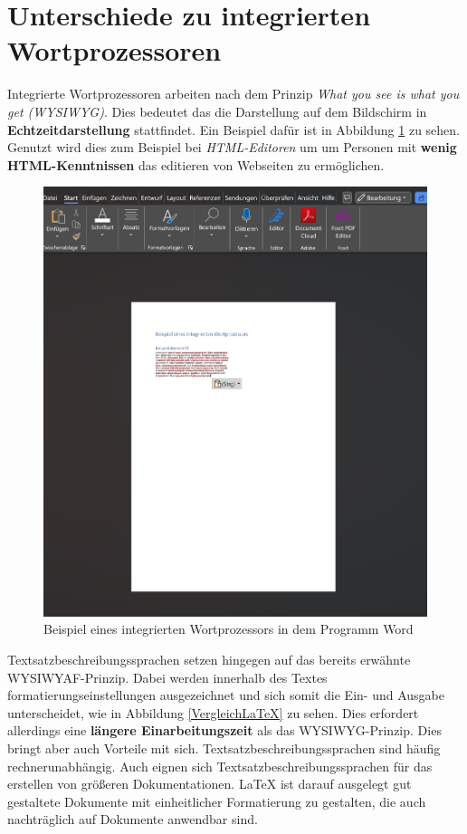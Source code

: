 \section{Unterschiede zu integrierten Wortprozessoren}
Integrierte Wortprozessoren arbeiten nach dem Prinzip \textit{What you see is what you get (WYSIWYG)}. Dies bedeutet das die Darstellung auf dem Bildschirm in \textbf{Echtzeitdarstellung} stattfindet. Ein Beispiel dafür ist in Abbildung \ref{Wortprozessor} zu sehen. Genutzt wird dies zum Beispiel bei \textit{HTML-Editoren} um um Personen mit \textbf{wenig HTML-Kenntnissen} das editieren von Webseiten zu ermöglichen.

\begin{figure}[h]
	\centering
	\includegraphics[scale=0.5]{Images/Wortprozessor.png}
	\caption{Beispiel eines integrierten Wortprozessors in dem Programm Word}
	\label{Wortprozessor}
\end{figure}

Textsatzbeschreibungssprachen setzen hingegen auf das bereits erwähnte WYSIWYAF-Prinzip. Dabei werden innerhalb des Textes formatierungseinstellungen ausgezeichnet und sich somit die Ein- und Ausgabe unterscheidet, wie in Abbildung \ref{VergleichLaTeX} zu sehen. Dies erfordert allerdings eine \textbf{längere Einarbeitungszeit} als das WYSIWYG-Prinzip.
Dies bringt aber auch Vorteile mit sich. Textsatzbeschreibungssprachen sind häufig rechnerunabhängig. Auch eignen sich Textsatzbeschreibungssprachen für das erstellen von größeren Dokumentationen. LaTeX ist darauf ausgelegt gut gestaltete Dokumente mit einheitlicher Formatierung zu gestalten, die auch nachträglich auf Dokumente anwendbar sind. 

